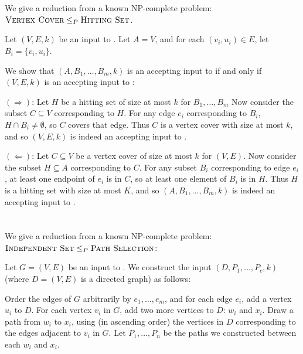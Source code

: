 \documentclass[11pt]{article}
\begin{document}
\section{} %
We give a reduction from a known NP-complete problem: $\textproc{Vertex Cover} \le_P \textproc{Hitting Set}$.

Let $(V, E, k)$ be an input to .
Let $A = V$, and for each $(v_i, u_i) \in E$, let $B_i = \{v_i, u_i\}$.

We show that $(A, B_1, \ldots, B_m, k)$ is an accepting input to  if and only if $(V, E, k)$ is an accepting input to :
\newline

\noindent
$(\Longrightarrow)$:
Let $H$ be a hitting set of size at most $k$ for $B_1, \ldots, B_m$
Now consider the subset $C \subseteq V$ corresponding to $H$.
For any edge $e_i$ corresponding to $B_i$, $H \cap B_i \neq \emptyset$, so $C$ covers that edge.
Thus $C$ is a vertex cover with size at most $k$, and so $(V, E, k)$ is indeed an accepting input to .
\newline

\noindent
$(\Longleftarrow)$:
Let $C \subseteq V$ be a vertex cover of size at most $k$ for $(V, E)$.
Now consider the subset $H \subseteq A$ corresponding to $C$.
For any subset $B_i$ corresponding to edge $e_i$, at least one endpoint of $e_i$ is in $C$, so at least one element of $B_i$ is in $H$.
Thus $H$ is a hitting set with size at most $K$, and so $(A, B_1, \ldots, B_m, k)$ is indeed an accepting input to .


\section{} %
We give a reduction from a known NP-complete problem: $\textproc{Independent Set} \le_P \textproc{Path Selection}$:

Let $G = (V, E)$ be an input to .
We construct the input $(D, P_1, \ldots, P_c, k)$ (where $D = (V, E)$ is a directed graph) as follows:

Order the edges of $G$ arbitrarily by $e_1, \ldots, e_m$, and for each edge $e_i$, add a vertex $u_i$ to $D$.
For each vertex $v_i$ in $G$, add two more vertices to $D$: $w_i$ and $x_i$.
Draw a path from $w_i$ to $x_i$, using (in ascending order) the vertices in $D$ corresponding to the edges adjacent to $v_i$ in $G$.
Let $P_1, \ldots, P_n$ be the paths we constructed between each $w_i$ and $x_i$.
\end{document}

